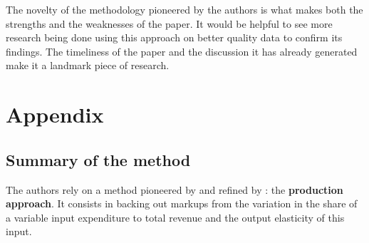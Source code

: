 \documentclass{amsart}
\theoremstyle{definition}
\theoremstyle{remark}
\numberwithin{equation}{section}
\begin{document}
The novelty of the methodology pioneered by the authors is what makes both the strengths and the weaknesses of the paper. It would be helpful to see more research being done using this approach on better quality data to confirm its findings. The timeliness of the paper and the discussion it has already generated make it a landmark piece of research.

\newpage




\newpage

\section*{Appendix}

\subsection*{Summary of the method}


The authors rely on a method pioneered by \cite{hall1988relation} and refined by \cite{de2012markups}: the \textbf{production approach}. It consists in backing out markups from the variation in the share of a variable input expenditure to total revenue and the output elasticity of this input.\\

\end{document}
